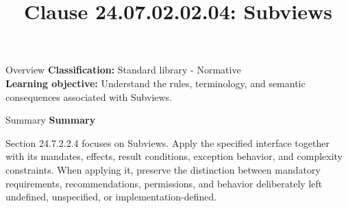 \documentclass[10pt,letterpaper]{article}
\title{Clause 24.07.02.02.04: Subviews}
\author{}
\date{}
\begin{document}
\maketitle
\begin{CornellOverviewBox}{Overview}
\textbf{Classification:} Standard library - Normative\\[2pt]
\textbf{Learning objective:} Understand the rules, terminology, and semantic consequences associated with Subviews.
\end{CornellOverviewBox}\begin{CornellSummaryBox}{Summary}
{\sffamily\bfseries\color{Accent} Summary}\par\vspace{3pt}Section 24.7.2.2.4 focuses on Subviews. Apply the specified interface together with its mandates, effects, result conditions, exception behavior, and complexity constraints. When applying it, preserve the distinction between mandatory requirements, recommendations, permissions, and behavior deliberately left undefined, unspecified, or implementation-defined.
\end{CornellSummaryBox}
\end{document}
